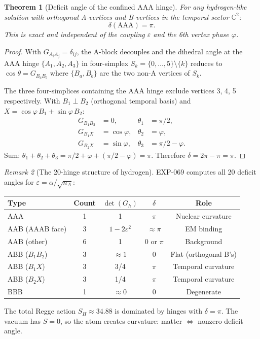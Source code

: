\documentclass[12pt]{article}
\newtheorem{theorem}{Theorem}[section]
\theoremstyle{remark}
\newtheorem{remark}[theorem]{Remark}
\theoremstyle{definition}
\newcommand{\CC}{\mathbb{C}}
\begin{document}
\begin{theorem}[Deficit angle of the confined AAA hinge]
\label{thm:delta_AAA}
For any hydrogen-like solution with orthogonal A-vertices and B-vertices in the temporal sector $\CC^2$:
\begin{equation}
\boxed{\delta(\mathrm{AAA}) = \pi.}
\end{equation}
This is exact and independent of the coupling $\varepsilon$ and the 6th vertex phase $\varphi$.
\end{theorem}
\begin{proof}
With $G_{A_i A_j} = \delta_{ij}$, the A-block decouples and the dihedral angle at the AAA hinge $\{A_1,A_2,A_3\}$ in four-simplex $S_k = \{0,\ldots,5\}\setminus\{k\}$ reduces to $\cos\theta = G_{B_a B_b}$ where $\{B_a,B_b\}$ are the two non-A vertices of $S_k$.

The three four-simplices containing the AAA hinge exclude vertices 3, 4, 5 respectively.  With $B_1 \perp B_2$ (orthogonal temporal basis) and $X = \cos\varphi\,B_1 + \sin\varphi\,B_2$:
\begin{align}
G_{B_1 B_2} &= 0, & \theta_1 &= \pi/2, \\
G_{B_1 X} &= \cos\varphi, & \theta_2 &= \varphi, \\
G_{B_2 X} &= \sin\varphi, & \theta_3 &= \pi/2 - \varphi.
\end{align}
Sum: $\theta_1 + \theta_2 + \theta_3 = \pi/2 + \varphi + (\pi/2 - \varphi) = \pi$.  Therefore $\delta = 2\pi - \pi = \pi$.
\end{proof}

\begin{remark}[The 20-hinge structure of hydrogen]
EXP-069 computes all 20 deficit angles for $\varepsilon = \alpha/\sqrt{n_A}$:
\begin{center}
\begin{tabular}{lcccc}
\hline
Type & Count & $\det(G_h)$ & $\delta$ & Role \\
\hline
AAA & 1 & 1 & $\pi$ & Nuclear curvature \\
AAB (AAAB face) & 3 & $1-2\varepsilon^2$ & $\approx \pi$ & EM binding \\
AAB (other) & 6 & 1 & $0$ or $\pi$ & Background \\
ABB ($B_1 B_2$) & 3 & $\approx 1$ & $0$ & Flat (orthogonal B's) \\
ABB ($B_1 X$) & 3 & 3/4 & $\pi$ & Temporal curvature \\
ABB ($B_2 X$) & 3 & 1/4 & $\pi$ & Temporal curvature \\
BBB & 1 & $\approx 0$ & 0 & Degenerate \\
\hline
\end{tabular}
\end{center}
The total Regge action $S_H \approx 34.88$ is dominated by hinges with $\delta = \pi$.  The vacuum has $S = 0$, so the atom creates curvature: matter $\Leftrightarrow$ nonzero deficit angle.
\end{remark}
\end{document}
